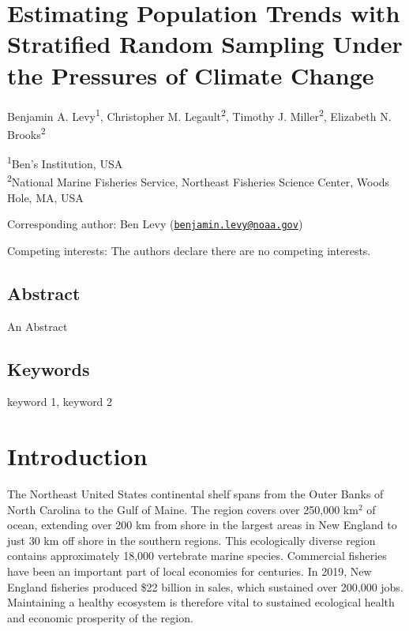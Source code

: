 \documentclass[
  12pt,
]{article}
\author{}
\date{\vspace{-2.5em}}
\begin{document}
\newpage

\hypertarget{estimating-population-trends-with-stratified-random-sampling-under-the-pressures-of-climate-change}{%
\section{Estimating Population Trends with Stratified Random Sampling Under the Pressures of Climate Change}\label{estimating-population-trends-with-stratified-random-sampling-under-the-pressures-of-climate-change}}

Benjamin A. Levy\textsuperscript{1}, Christopher M. Legault\textsuperscript{2}, Timothy J. Miller\textsuperscript{2}, Elizabeth N. Brooks\textsuperscript{2}

\textsuperscript{1}Ben's Institution, USA\\
\textsuperscript{2}National Marine Fisheries Service, Northeast Fisheries Science Center, Woods Hole, MA, USA

Corresponding author: Ben Levy (\href{mailto:benjamin.levy@noaa.gov}{\nolinkurl{benjamin.levy@noaa.gov}})

Competing interests: The authors declare there are no competing interests.

\newpage

\hypertarget{abstract}{%
\subsection{Abstract}\label{abstract}}

An Abstract

\hypertarget{keywords}{%
\subsection{Keywords}\label{keywords}}

keyword 1, keyword 2

\newpage

\section{Introduction}

The Northeast United States continental shelf spans from the Outer Banks of North Carolina to the Gulf of Maine. The region covers over 250,000 km\(^2\) of ocean, extending over 200 km from shore in the largest areas in New England to just 30 km off shore in the southern regions. This ecologically diverse region contains approximately 18,000 vertebrate marine species. Commercial fisheries have been an important part of local economies for centuries. In 2019, New England fisheries produced \$22 billion in sales, which sustained over 200,000 jobs. Maintaining a healthy ecosystem is therefore vital to sustained ecological health and economic prosperity of the region.
\end{document}
